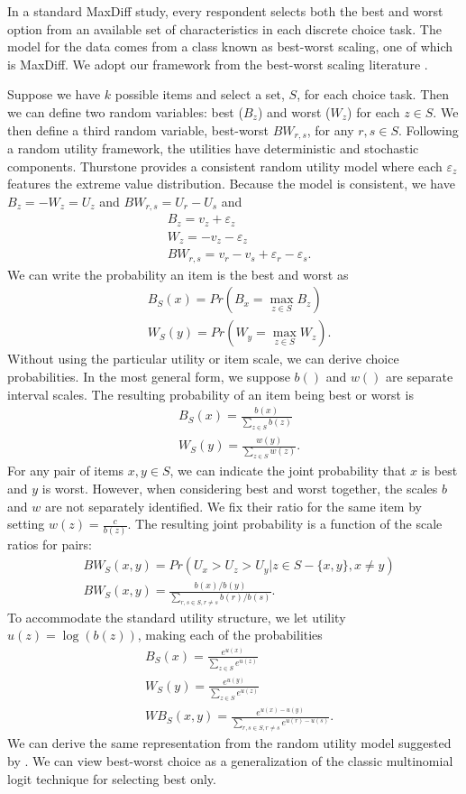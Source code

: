 \documentclass[nonblindrev]{informs3}
\begin{document}
In a standard MaxDiff study, every respondent selects both the best and worst option from an available set of characteristics in each discrete choice task. The model for the data comes from a class known as best-worst scaling, one of which is MaxDiff. We adopt our framework from the best-worst scaling literature \citep{marley2005some,marley2012models}. 

Suppose we have $k$ possible items and select a set, $S$, for each choice task. Then we can define two random variables: best ($B_z$) and worst ($W_z$) for each $z \in S$.  We then define a third random variable, best-worst $BW_{r,s}$, for any $r,s \in S$. Following a random utility framework, the utilities have deterministic and stochastic components. Thurstone provides a consistent random utility model where each $\varepsilon_z$ features the extreme value distribution. Because the model is consistent, we have $B_z=-W_z=U_z$ and $BW_{r,s}=U_r-U_s$ and
\begin{align*}
&B_z=v_z+\varepsilon_z\\
&W_z=-v_z-\varepsilon_z\\
&BW_{r,s}=v_r-v_s+\varepsilon_r-\varepsilon_s.
\end{align*}We can write the probability an item is the best and worst as
\begin{align*}
&B_S (x)= Pr⁡( B_x=\max_{z \in S} B_z)\\
&W_S (y)= Pr⁡( W_y=\max_{z \in S} W_z).
\end{align*}
Without using the particular utility or item scale, we can derive choice probabilities. In the most general form, we suppose $b()$ and $w()$ are separate interval scales. The resulting probability of an item being best or worst is
\begin{align*}
&B_S (x)= \frac{b(x)}{\sum_{z \in S}b(z)}\\
&W_S (y)= \frac{w(y)}{\sum_{z \in S}w(z)}.
\end{align*}
For any pair of items $x,y \in S$, we can indicate the joint probability that $x$ is best and $y$ is worst. However, when considering best and worst together, the scales $b$ and $w$ are not separately identified. We fix their ratio for the same item by setting $w(z)=\frac{c}{b(z)}$. The resulting joint probability is a function of the scale ratios for pairs: 
\begin{align*}
&BW_S(x,y)=Pr(U_x>U_z>U_y | z \in S -\{x,y\}, x\neq y)\\
&BW_S(x,y)=\frac{b(x)/b(y)}{\sum_{r,s \in S, r \neq s}b(r)/b(s)}.
\end{align*}
To accommodate the standard utility structure, we let utility $u(z)=\log{(b(z))}$, making each of the probabilities 
\begin{align*}
&B_S(x)=\frac{e^{u(x)}}{\sum_{z \in S} e^{u(z)}}\\
&W_S(y)=\frac{e^{u(y)}}{\sum_{z \in S} e^{u(z)}}\\
&WB_S(x,y)=\frac{e^{u(x)-u(y)}}{\sum_{r,s \in S, r\neq s} e^{u(r)-u(s)}}.
\end{align*}
We can derive the same representation from the random utility model suggested by \cite{marley2005some}. We can view best-worst choice as a generalization of the classic multinomial logit technique for selecting best only.
\end{document}
